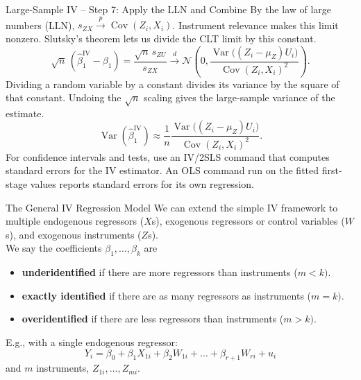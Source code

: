 \documentclass[notes,10pt, aspectratio=169]{beamer}
\begin{document}
\begin{frame}{Large-Sample IV\texorpdfstring{ -- }{ - }Step 7: Apply the LLN and Combine}
\small
By the law of large numbers (LLN), $s_{ZX}\xrightarrow{p}\operatorname{Cov}(Z_i,X_i)$. Instrument relevance makes this limit nonzero. Slutsky's theorem lets us divide the CLT limit by this constant.
\[
\sqrt n\,(\hat\beta_1^{\mathrm{IV}}-\beta_1)
=\frac{\sqrt n\,s_{ZU}}{s_{ZX}}
\xrightarrow{d}
\mathcal{N}\!\left(0,
\frac{\operatorname{Var}\bigl((Z_i-\mu_Z)U_i\bigr)}
     {\operatorname{Cov}(Z_i,X_i)^2}\right).
\]
Dividing a random variable by a constant divides its variance by the square of that constant. Undoing the $\sqrt n$ scaling gives the large-sample variance of the estimate.
\[
\operatorname{Var}(\hat\beta_1^{\mathrm{IV}})\approx
\frac{1}{n}
\frac{\operatorname{Var}\bigl((Z_i-\mu_Z)U_i\bigr)}
     {\operatorname{Cov}(Z_i,X_i)^2}.
\]
For confidence intervals and tests, use an IV/2SLS command that computes standard errors for the IV estimator. An OLS command run on the fitted first-stage values reports standard errors for its own regression.
\end{frame}

\begin{frame}{The General  IV  Regression Model }
We can extend the simple IV framework to multiple endogenous regressors ($X$s), exogenous regressors or control variables ($W$s), and exogenous instruments ($Z$s).\\[1em]
We say the coefficients $\beta_1, \dots, \beta_k$ are
\begin{itemize}
    \item \textbf{underidentified} if there are more regressors than instruments ($m<k)$.
    \item \textbf{exactly identified} if there are as many regressors as instruments ($m=k)$.
    \item \textbf{overidentified} if there are less regressors than instruments ($m>k)$.
\end{itemize}
\vspace{1em}
E.g., with a single endogenous regressor:
\begin{equation*}
    Y_i = \beta_0 + \beta_1 X_{1i} + \beta_2 W_{1i} + \dots + \beta_{r+1} W_{ri} + u_i
\end{equation*}
and $m$ instruments, $Z_{1i}, \dots,Z_{mi}$.
\end{frame}
\end{document}
